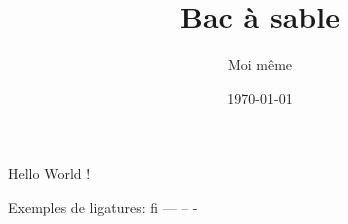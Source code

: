 \documentclass[11 pt]{article} %
\title{Bac à sable}
\author{Moi même}
\date{\today}
\begin{document}
\maketitle

\begin{abstract}
  \blindtext
\end{abstract}

Hello World !

Exemples de ligatures: fi --- -- -

\blinddocument

\end{document}
